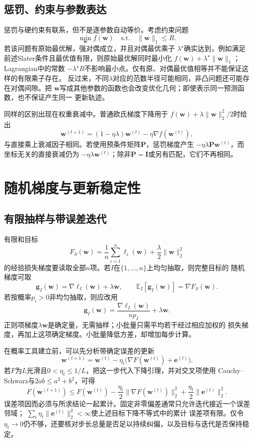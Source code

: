 \subsection{惩罚、约束与参数表达}

惩罚与硬约束有联系，但不是逐参数自动等价。考虑约束问题
\[
  \min_{\bm{w}}f(\bm{w})
  \quad\text{s.t.}\quad
  \lVert\bm{w}\rVert_1\leq R.
\]
若该问题有原始最优解，强对偶成立，并且对偶最优乘子
$\lambda^\star$确实达到，例如满足前述Slater条件且最优值有限，则原始最优解同时最小化
$f(\bm{w})+\lambda^\star\lVert\bm{w}\rVert_1$；Lagrangian中的常数
$-\lambda^\star R$不影响最小点。仅有原、对偶最优值相等并不能保证这样的有限乘子存在。
反过来，不同$\lambda$对应的范数半径可能相同，非凸问题还可能存在对偶间隙。把
$\bm{w}$写成其他参数的函数也会改变优化几何；即使表示同一预测函数，也不保证产生同一
更新轨迹。

同样的区别出现在权重衰减中。普通欧氏梯度下降用于
$f(\bm{w})+\lambda\lVert\bm{w}\rVert_2^2/2$时给出
\[
  \bm{w}^{(t+1)}
  =(1-\eta\lambda)\bm{w}^{(t)}-\eta\nabla f(\bm{w}^{(t)}),
\]
与直接乘上衰减因子相同。若使用预条件矩阵$\bm{P}$，惩罚梯度产生
$-\eta\lambda\bm{P}\bm{w}^{(t)}$，而坐标无关的直接衰减仍为
$-\eta\lambda\bm{w}^{(t)}$；除非$\bm{P}=\bm{I}$或另有匹配，它们不再相同。

\section{随机梯度与更新稳定性}
\label{sec:opt-stochastic-gradient-stability}

\subsection{有限抽样与带误差迭代}

有限和目标
\[
  F_S(\bm{w})=\frac1n\sum_{i=1}^n\ell_i(\bm{w})
  +\frac{\lambda}{2}\lVert\bm{w}\rVert_2^2
\]
的经验损失梯度要读取全部$n$项。若$I$在$\{1,\ldots,n\}$上均匀抽取，则完整目标的
随机梯度可取
\[
  \bm{g}_I(\bm{w})
  =\nabla\ell_I(\bm{w})+\lambda\bm{w},\qquad
  \mathbb{E}_I[\bm{g}_I(\bm{w})]
  =\nabla F_S(\bm{w}).
\]
若按概率$p_i>0$非均匀抽取，则应改用
\[
  \bm{g}_I(\bm{w})
  =\frac{\nabla\ell_I(\bm{w})}{np_I}+\lambda\bm{w}.
\]
正则项梯度$\lambda\bm{w}$是确定量，无需抽样；小批量只需平均若干经过相应加权的
损失梯度，再加上这项确定梯度。小批量降低方差，却增加每步计算。

在概率工具建立前，可以先分析带确定误差的更新
\[
  \bm{w}^{(t+1)}
  =\bm{w}^{(t)}-\eta_t
  \bigl(\nabla F(\bm{w}^{(t)})+\bm{e}^{(t)}\bigr).
\]
若$F$为$L$光滑且$0<\eta_t\leq1/L$，把这一步代入下降引理，并对交叉项使用
Cauchy--Schwarz与$2ab\leq a^2+b^2$，可得
\[
  F(\bm{w}^{(t+1)})
  \leq F(\bm{w}^{(t)})
  -\frac{\eta_t}{2}\lVert\nabla F(\bm{w}^{(t)})\rVert_2^2
  +\frac{\eta_t}{2}\lVert\bm{e}^{(t)}\rVert_2^2.
\]
误差项因而必须与所求结论一起累计。固定非零偏差通常只允许迭代接近一个误差邻域；
$\sum_t\eta_t\lVert\bm{e}^{(t)}\rVert_2^2<\infty$使上述目标下降不等式中的累计
误差项有限。仅令
$\eta_t\to0$仍不够，还要核对步长总量是否足以持续纠偏，以及目标与迭代是否保持稳定。

